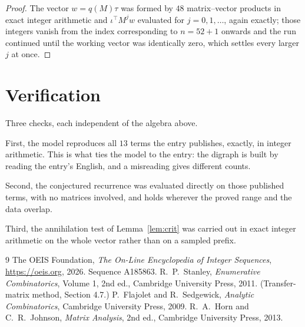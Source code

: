 \documentclass[11pt,a4paper]{article}
\theoremstyle{plain}
\theoremstyle{definition}
\begin{document}
\begin{proof}
The vector $w=q(M)\tau$ was formed by $48$ matrix--vector products in exact integer
arithmetic and $\iota^{\!\top}M^{j}w$ evaluated for $j=0,1,\dots$, again exactly; those
integers vanish from the index corresponding to $n=52+1$ onwards and the run continued
until the working vector was identically zero, which settles every larger $j$ at once.
\end{proof}

\section{Verification}

Three checks, each independent of the algebra above.

First, the model reproduces all $13$ terms the entry publishes, exactly, in integer
arithmetic. This is what ties the model to the entry: the digraph is built by reading the
entry's English, and a misreading gives different counts.

Second, the conjectured recurrence was evaluated directly on those published terms, with no
matrices involved, and holds wherever the proved range and the data overlap.

Third, the annihilation test of Lemma~\ref{lem:crit} was carried out in exact integer
arithmetic on the whole vector rather than on a sampled prefix.

\begin{thebibliography}{9}
 The OEIS Foundation, \emph{The On-Line Encyclopedia of Integer
Sequences}, \url{https://oeis.org}, 2026. Sequence A185863.
 R.~P.~Stanley, \emph{Enumerative Combinatorics}, Volume 1, 2nd ed.,
Cambridge University Press, 2011. (Transfer-matrix method, Section 4.7.)
 P.~Flajolet and R.~Sedgewick, \emph{Analytic Combinatorics}, Cambridge
University Press, 2009.
 R.~A.~Horn and C.~R.~Johnson, \emph{Matrix Analysis}, 2nd ed., Cambridge
University Press, 2013.
\end{thebibliography}
\end{document}
